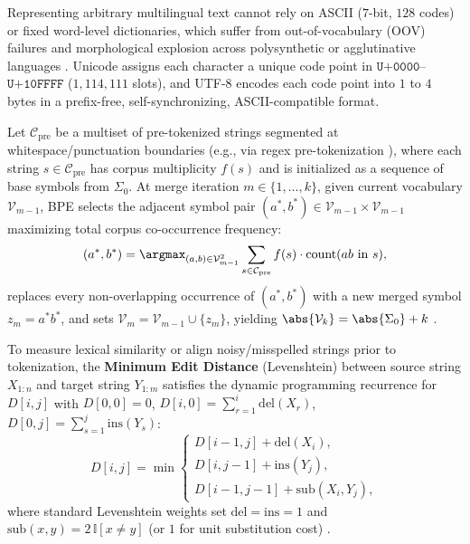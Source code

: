 \documentclass[../../../../master.tex]{subfiles}
\begin{document}
Representing arbitrary multilingual text cannot rely on ASCII ($7$-bit, $128$ codes) or fixed word-level dictionaries, which suffer from out-of-vocabulary (OOV) failures and morphological explosion across polysynthetic or agglutinative languages . Unicode assigns each character a unique code point in $\texttt{U+0000}$--$\texttt{U+10FFFF}$ ($1{,}114{,}111$ slots), and UTF-8 encodes each code point into $1$ to $4$ bytes in a prefix-free, self-synchronizing, ASCII-compatible format.

\begin{coremath}
Let $\mathcal{C}_{\mathrm{pre}}$ be a multiset of pre-tokenized strings segmented at whitespace/punctuation boundaries (e.g., via regex pre-tokenization ), where each string $s \in \mathcal{C}_{\mathrm{pre}}$ has corpus multiplicity $f(s)$ and is initialized as a sequence of base symbols from $\Sigma_0$. At merge iteration $m \in \{1,\dots,k\}$, given current vocabulary $\mathcal{V}_{m-1}$, BPE selects the adjacent symbol pair $(a^*, b^*) \in \mathcal{V}_{m-1} \times \mathcal{V}_{m-1}$ maximizing total corpus co-occurrence frequency:
\begin{equation}
  (a^*, b^*) = \argmax_{(a, b) \in \mathcal{V}_{m-1}^2} \sum_{s \in \mathcal{C}_{\mathrm{pre}}} f(s) \cdot \mathrm{count}(ab \text{ in } s),
  \label{eq:tok:bpe_merge}
\end{equation}
replaces every non-overlapping occurrence of $(a^*, b^*)$ with a new merged symbol $z_m = a^* b^*$, and sets $\mathcal{V}_m = \mathcal{V}_{m-1} \cup \{z_m\}$, yielding $\abs{\mathcal{V}_k} = \abs{\Sigma_0} + k$ .

To measure lexical similarity or align noisy/misspelled strings prior to tokenization, the \textbf{Minimum Edit Distance} (Levenshtein) between source string $X_{1:n}$ and target string $Y_{1:m}$ satisfies the dynamic programming recurrence for $D[i, j]$ with $D[0,0]=0$, $D[i,0]=\sum_{r=1}^i \mathrm{del}(X_r)$, $D[0,j]=\sum_{s=1}^j \mathrm{ins}(Y_s)$:
\begin{equation}
  D[i, j] = \min \begin{cases}
    D[i-1, j] + \mathrm{del}(X_i), \\
    D[i, j-1] + \mathrm{ins}(Y_j), \\
    D[i-1, j-1] + \mathrm{sub}(X_i, Y_j),
  \end{cases}
  \label{eq:tok:edit_dist}
\end{equation}
where standard Levenshtein weights set $\mathrm{del}=\mathrm{ins}=1$ and $\mathrm{sub}(x,y) = 2\,\mathbb{I}[x \neq y]$ (or $1$ for unit substitution cost) .
\end{coremath}
\end{document}
